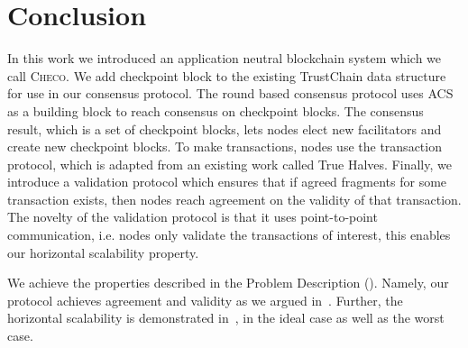 \section{Conclusion}
\label{sec:conclusion}

In this work we introduced an application neutral blockchain system which we call \textsc{Checo}.
We add checkpoint block to the existing TrustChain data structure for use in our consensus protocol.
The round based consensus protocol uses ACS as a building block to reach consensus on checkpoint blocks.
The consensus result, which is a set of checkpoint blocks, lets nodes elect new facilitators and create new checkpoint blocks.
To make transactions, nodes use the transaction protocol,
which is adapted from an existing work called True Halves.
Finally, we introduce a validation protocol which ensures that if agreed fragments for some transaction exists,
then nodes reach agreement on the validity of that transaction.
The novelty of the validation protocol is that it uses point-to-point communication,
i.e. nodes only validate the transactions of interest,
this enables our horizontal scalability property.

We achieve the properties described in the Problem Description ().
Namely, our protocol achieves agreement and validity as we argued in~.
Further, the horizontal scalability is demonstrated in~,
in the ideal case as well as the worst case.
